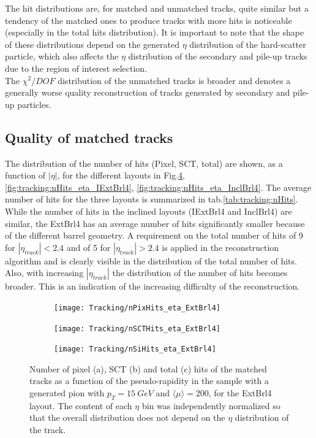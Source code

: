 \documentclass[a4paper,twoside,12pt]{book}
\begin{document}
The hit distributions are, for matched and unmatched tracks, quite similar but a tendency of the matched ones to produce tracks with more hits is noticeable (especially in the total hits distribution). It is important to note that the shape of these distributions depend on the generated $\eta$ distribution of the hard-scatter particle, which
also affects the $\eta$ distribution of the secondary and pile-up tracks due to the region of interest selection. \\

The $\chi^2/DOF$ distribution of the unmatched tracks is broader and denotes a generally worse quality reconstruction of tracks generated by secondary and pile-up particles. \\

\subsection{Quality of matched tracks}
The distribution of the number of hits (Pixel, SCT, total) are shown, as a function of $|\eta|$, 
for the different layouts in Fig.\ref{fig:tracking:nHits_eta_ExtBrl4},
 \ref{fig:tracking:nHits_eta_IExtBrl4}, \ref{fig:tracking:nHits_eta_InclBrl4}.
The average number of hits for the three layouts is summarized in tab.\ref{tab:tracking:nHits}. While
 the number of hits in the inclined layouts (IExtBrl4 and InclBrl4) are similar, the ExtBrl4
 has an average number of hits significantly smaller because of the different barrel geometry. A requirement on the total number of hits of 9 for $|\eta_{track}| < 2.4$ and of 5 for $|\eta_{track}| > 2.4$ is applied in the reconstruction algorithm
 and is clearly visible in the distribution of the total number of hits. Also, with increasing $|\eta_{track}|$ the distribution of the number of hits becomes broader. This is an indication of the increasing
 difficulty of the reconstruction.  \\

\begin{figure}
\begin{subfigure}{\linewidth}
\centering
\texttt{[image: Tracking/nPixHits\_eta\_ExtBrl4]}
\caption{}
\label{fig:tracking:nPixHits_eta_ExtBrl4}
\end{subfigure}

\begin{subfigure}{\linewidth}
\centering
\texttt{[image: Tracking/nSCTHits\_eta\_ExtBrl4]}
\caption{}
\label{fig:tracking:nSCTHits_eta_ExtBrl4}
\end{subfigure}

\begin{subfigure}{\linewidth}
\centering
\texttt{[image: Tracking/nSiHits\_eta\_ExtBrl4]}
\caption{}
\label{fig:tracking:nSiHits_eta_ExtBrl4}
\end{subfigure}
\caption{Number of pixel (a), SCT (b) and total (c) hits of the matched tracks as a function of the pseudo-rapidity in the sample with a generated pion with $p_{T} = 15\ GeV$ and $\langle\mu\rangle = 200$, for the ExtBrl4 layout. The content of each $\eta$ bin was independently normalized so that the overall distribution does not depend on the $\eta$ distribution of the track.}
\label{fig:tracking:nHits_eta_ExtBrl4}
\end{figure}
\end{document}
